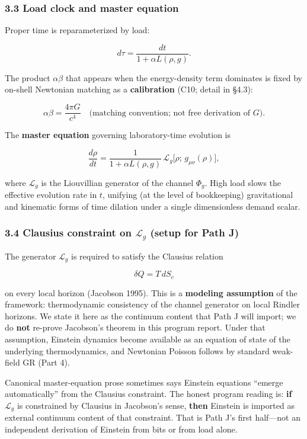 \documentclass[
  11pt,
]{article}
\begin{document}
\subsubsection{3.3 Load clock and master equation}\label{load-clock-and-master-equation}

Proper time is reparameterized by load:

\[
d\tau
=
\frac{dt}{1 + \alpha L(\rho,g)}.
\]

The product \(\alpha\beta\) that appears when the energy-density term dominates is fixed by on-shell Newtonian matching as a \textbf{calibration} (C10; detail in \S4.3):

\[
\alpha\beta = \frac{4\pi G}{c^4}
\quad\text{(matching convention; not free derivation of $G$).}
\]

The \textbf{master equation} governing laboratory-time evolution is

\[
\frac{d\rho}{dt}
=
\frac{1}{1 + \alpha L(\rho,g)}
\,\mathcal{L}_g\bigl[\rho;\, g_{\mu\nu}(\rho)\bigr],
\]

where \(\mathcal{L}_g\) is the Liouvillian generator of the channel \(\Phi_g\). High load slows the effective evolution rate in \(t\), unifying (at the level of bookkeeping) gravitational and kinematic forms of time dilation under a single dimensionless demand scalar.

\subsubsection{\texorpdfstring{3.4 Clausius constraint on \(\mathcal{L}_g\) (setup for Path J)}{3.4 Clausius constraint on \textbackslash mathcal\{L\}\_g (setup for Path J)}}\label{clausius-constraint-on-mathcall_g-setup-for-path-j}

The generator \(\mathcal{L}_g\) is required to satisfy the Clausius relation

\[
\delta Q = T\, dS_c
\]

on every local horizon (Jacobson 1995). This is a \textbf{modeling assumption} of the framework: thermodynamic consistency of the channel generator on local Rindler horizons. We state it here as the continuum content that Path J will import; we do \textbf{not} re-prove Jacobson's theorem in this program report. Under that assumption, Einstein dynamics become available as an equation of state of the underlying thermodynamics, and Newtonian Poisson follows by standard weak-field GR (Part 4).

Canonical master-equation prose sometimes says Einstein equations ``emerge automatically'' from the Clausius constraint. The honest program reading is: \textbf{if} \(\mathcal{L}_g\) is constrained by Clausius in Jacobson's sense, \textbf{then} Einstein is imported as external continuum content of that constraint. That is Path J's first half---not an independent derivation of Einstein from bits or from load alone.
\end{document}
